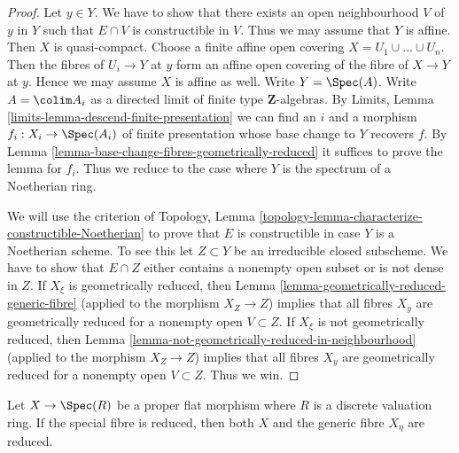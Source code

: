 \begin{proof}
Let $y \in Y$. We have to show that there exists an open neighbourhood
$V$ of $y$ in $Y$ such that $E \cap V$ is constructible in $V$. Thus we may
assume that $Y$ is affine. Then $X$ is quasi-compact.
Choose a finite affine open covering $X = U_1 \cup \ldots \cup U_n$.
Then the fibres of $U_i \to Y$ at $y$ form an affine open covering
of the fibre of $X \to Y$ at $y$. Hence we may assume $X$ is affine
as well.  Write $Y = \Spec(A)$.
Write $A = \colim A_i$ as a directed limit of finite type
$\mathbf{Z}$-algebras. By
Limits, Lemma \ref{limits-lemma-descend-finite-presentation}
we can find an $i$ and a morphism $f_i : X_i \to \Spec(A_i)$ of
finite presentation whose base change to $Y$ recovers $f$. By
Lemma \ref{lemma-base-change-fibres-geometrically-reduced}
it suffices to prove the lemma for $f_i$. Thus we reduce to
the case where $Y$ is the spectrum of a Noetherian ring.

\medskip\noindent
We will use the criterion of
Topology, Lemma \ref{topology-lemma-characterize-constructible-Noetherian}
to prove that $E$ is constructible in case $Y$ is a Noetherian scheme.
To see this let $Z \subset Y$ be an irreducible closed subscheme.
We have to show that $E \cap Z$ either contains a nonempty open subset
or is not dense in $Z$. If $X_\xi$ is geometrically reduced, then
Lemma \ref{lemma-geometrically-reduced-generic-fibre}
(applied to the morphism $X_Z \to Z$)
implies that all fibres $X_y$ are geometrically reduced
for a nonempty open $V \subset Z$.
If $X_\xi$ is not geometrically reduced, then
Lemma \ref{lemma-not-geometrically-reduced-in-neighbourhood}
(applied to the morphism $X_Z \to Z$)
implies that all fibres $X_y$ are geometrically reduced
for a nonempty open $V \subset Z$. Thus we win.
\end{proof}

\begin{lemma}
\label{lemma-proper-flat-over-dvr-reduced-fibre}
Let $X \to \Spec(R)$ be a proper flat morphism where $R$ is a
discrete valuation ring. If the special fibre is reduced, then
both $X$ and the generic fibre $X_\eta$ are reduced.
\end{lemma}

